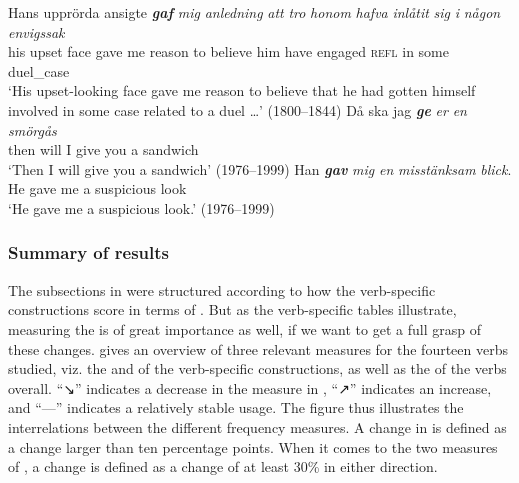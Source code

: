 \documentclass[output=paper]{langscibook}
\begin{document}
\ex
\gll Hans   upprörda   ansigte \textbf{\textit{gaf}} \textit{mig} \textit{anledning}   \textit{att}   \textit{tro}   \textit{honom} \textit{hafva}   \textit{inlåtit}   \textit{sig}   \textit{i}   \textit{någon} \textit{envigssak}\\
 his       upset         face     gave   me   reason         to     believe  him         have       engaged \textsc{refl} in   some   duel\_case\\
\glt ‘His upset-looking face gave me reason to believe that he had gotten himself involved in some case related to a duel …’ (1800–1844)
\z
\ex \label{ex:valdeson:35}
\ea
\gll Då   ska   jag \textbf{\textit{ge}} \textit{er}     \textit{en} \textit{smörgås}\\
      then   will   I   give you   a   sandwich\\
\glt ‘Then I will give you a sandwich’ (1976–1999)
\ex
\gll Han \textbf{\textit{gav}} \textit{mig}   \textit{en} \textit{misstänksam} \textit{blick}.\\
        He     gave   me     a   suspicious     look\\
\glt ‘He gave me a suspicious look.’ (1976–1999)
\z
\z

\subsubsection{Summary of results}\label{sec:valdeson:5.3.5}


The subsections in  were structured according to how the verb-specific constructions score in terms of . But as the verb-specific tables illustrate, measuring the  is of great importance as well, if we want to get a full grasp of these changes.  gives an overview of three relevant measures for the fourteen verbs studied, viz. the  and  of the verb-specific constructions, as well as the  of the verbs overall. ``↘'' indicates a decrease in the measure in , ``↗'' indicates an increase, and ``---'' indicates a relatively stable usage. The figure thus illustrates the interrelations between the different frequency measures. A change in  is defined as a change larger than ten percentage points. When it comes to the two measures of , a change is defined as a change of at least 30\% in either direction.\largerpage
\end{document}
